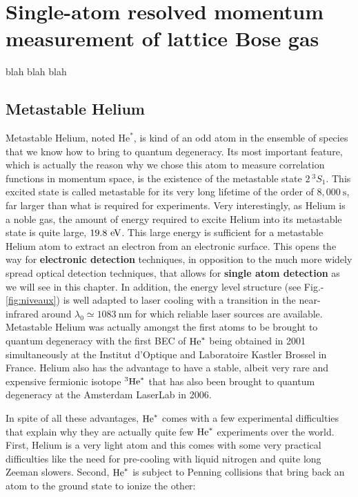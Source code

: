 \chapter{Single-atom resolved momentum measurement of lattice Bose gas}

\label{sec:chapter_3}

blah blah blah

\section{Metastable Helium}

Metastable Helium, noted $\mathrm{He}^*$, is kind of an odd atom in the ensemble of species that we know how to bring to quantum degeneracy. Its most important feature, which is actually the reason why we chose this atom to measure correlation functions in momentum space, is the existence of the metastable state $2 \ ^3 S_1$. This excited state is called metastable for its very long lifetime of the order of $8,000 \ \mathrm{s}$, far larger than what is required for experiments. Very interestingly, as Helium is a noble gas, the amount of energy required to excite Helium into its metastable state is quite large, $19.8 \ \rm{eV}$. This large energy is sufficient for a metastable Helium atom to extract an electron from an electronic surface. This opens the way for \textbf{electronic detection} techniques, in opposition to the much more widely spread optical detection techniques, that allows for \textbf{single atom detection} as we will see in this chapter. In addition, the energy level structure (see Fig.-\ref{fig:niveaux}) is well adapted to laser cooling with a transition in the near-infrared around $\lambda_0 \simeq 1083 \ \mathrm{nm}$ for which reliable laser sources are available. Metastable Helium was actually amongst the first atoms to be brought to quantum degeneracy with the first BEC of $\mathrm{He}^*$ being obtained in 2001 simultaneously at the Institut d'Optique and Laboratoire Kastler Brossel in France. Helium also has the advantage to have a stable, albeit very rare and expensive fermionic isotope $^3 \mathrm{He}^*$ that has also been brought to quantum degeneracy at the Amsterdam LaserLab in 2006.

In spite of all these advantages, $\mathrm{He}^*$ comes with a few experimental difficulties that explain why they are actually quite few $\mathrm{He}^*$ experiments over the world. First, Helium is a very light atom and this comes with some very practical difficulties like the need for pre-cooling with liquid nitrogen and quite long Zeeman slowers. Second, $\mathrm{He}^*$ is subject to Penning collisions that bring back an atom to the ground state to ionize the other:

